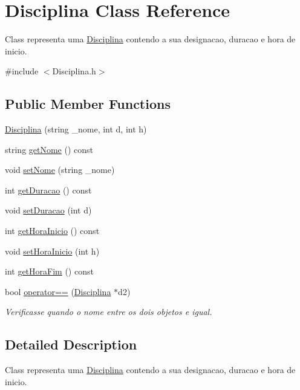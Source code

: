 \hypertarget{class_disciplina}{\section{Disciplina Class Reference}
\label{class_disciplina}
}


Class representa uma \hyperlink{class_disciplina}{Disciplina} contendo a sua designacao, duracao e hora de inicio.  




{\ttfamily \#include $<$Disciplina.\-h$>$}

\subsection*{Public Member Functions}
\begin{DoxyCompactItemize}
\item 
\hyperlink{class_disciplina_ae4496d51677842852775c89892387daf}{Disciplina} (string \-\_\-nome, int d, int h)
\item 
string \hyperlink{class_disciplina_a09445908668708d2b62feb8b600a6af6}{get\-Nome} () const 
\item 
void \hyperlink{class_disciplina_a2d8e0957375f6d9f1f720a58acfb80de}{set\-Nome} (string \-\_\-nome)
\item 
int \hyperlink{class_disciplina_aa3f19dc881279231e7eaa3194f01c4df}{get\-Duracao} () const 
\item 
void \hyperlink{class_disciplina_aadc65f8c2f09352cc6f80881d67e720d}{set\-Duracao} (int d)
\item 
int \hyperlink{class_disciplina_afde765c64f78f530d09d404d15c4c5dd}{get\-Hora\-Inicio} () const 
\item 
void \hyperlink{class_disciplina_aa6822138c1277be2b2c5c420c1a1f34d}{set\-Hora\-Inicio} (int h)
\item 
int \hyperlink{class_disciplina_a28b929f7e36d902da32b0ecc329420b6}{get\-Hora\-Fim} () const 
\item 
bool \hyperlink{class_disciplina_a41f649eceb91b6e2cae441a5888c7b84}{operator==} (\hyperlink{class_disciplina}{Disciplina} $\ast$d2)
\begin{DoxyCompactList}\small\item\em Verificasse quando o nome entre os dois objetos e igual. \end{DoxyCompactList}\end{DoxyCompactItemize}


\subsection{Detailed Description}
Class representa uma \hyperlink{class_disciplina}{Disciplina} contendo a sua designacao, duracao e hora de inicio. 

